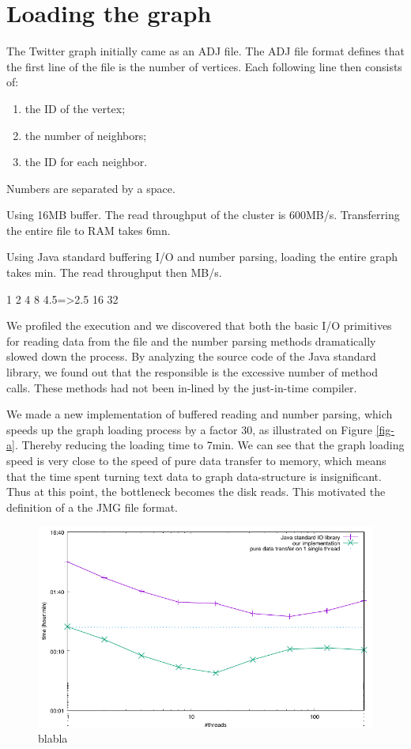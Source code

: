 \documentclass[11pt,a4paper]{article}
\begin{document}
\section{Loading the graph}


The Twitter graph initially came as an ADJ file. The ADJ file format defines that the first line of the file is the number of vertices. Each following line then consists of:
\begin{enumerate}
\item the ID of the vertex;
\item the number of neighbors;
\item the ID for each neighbor.
\end{enumerate}
Numbers are separated by a space.


Using 16MB buffer.
The read throughput of the cluster is 600MB/s. Transferring the entire file to RAM takes 6mn.

Using Java standard buffering I/O and number parsing, loading the entire graph takes min. The read throughput then MB/s.

1
2
4
8		4.5=>2.5
16
32

We profiled the execution and we discovered that both  the  basic I/O primitives for reading data from the file and the number parsing methods dramatically slowed down the process. By analyzing the source code of the Java standard library, we found out that the responsible is the excessive number of method calls. These methods had not been in-lined by the just-in-time compiler.

We made a new implementation of buffered reading and number parsing, which speeds up the graph loading process by a factor 30, as illustrated on Figure \ref{fig-a}. Thereby reducing the loading time to 7min. We can see that the graph loading speed is very close to the speed of pure data transfer to memory, which means that the time spent turning text data to graph data-structure is insignificant. Thus at this point, the bottleneck becomes the disk reads. This motivated the definition of a the JMG file format.


\begin{figure}
\begin{center}
\includegraphics[width=0.8\linewidth]{load.pdf}
\end{center}
\caption{blabla}
\end{figure}
\end{document}
